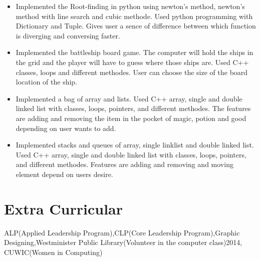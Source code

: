 \documentclass[10pt,a4paper,sans]{moderncv} %
\begin{document}
\begin{itemize}
\vspace{-6mm}
\item{Implemented the Root-finding in python using newton's method, newton's method with line search and cubic methode. Used python programming with Dictionary and Tuple. Gives user a sence of difference between which function is diverging and conversing faster.}
\end{itemize}
\begin{itemize}
\vspace{-6mm}
\item{Implemented the battleship board game. The computer will hold the ships in the grid and the player will have to guess where those ships are. Used C++ classes, loops and different methodes. User can choose the size of the board location of the ship.}
\end{itemize}
\begin{itemize}
\vspace{-6mm}
\item{Implemented a bag of array and lists. Used C++ array, single and double linked list with classes, loops, pointers, and different methodes. The features are adding and removing the item in the pocket of magic, potion and good depending on user wants to add.}
\end{itemize}
\begin{itemize}
\vspace{-6mm}
\item{Implemented stacks and queues of array, single linklist and double linked list. Used C++ array, single and double linked list with classes, loops, pointers, and different methodes. Features are adding and removing and moving element depend on users desire.}
\end{itemize}
\vspace{-5mm}
\section{Extra Curricular}
ALP(Applied Leadership Program),CLP(Core Leadership Program),Graphic Designing,Westminister Public Library(Volunteer in the computer class)2014, CUWIC(Women in Computing)


\end{document}
